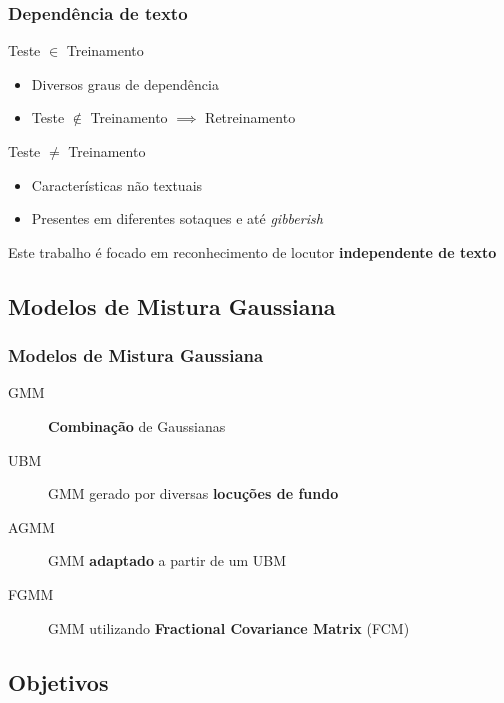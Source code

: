 \begin{frame}
\frametitle{Dependência de texto}
\begin{description}
    \item[Dependente] Teste $\in$ Treinamento
    \pause
    \begin{itemize}
        \item Diversos graus de dependência
        \pause
        \item Teste $\not\in$ Treinamento $\implies$ Retreinamento
        \pause
    \end{itemize}
    \item[Independente] Teste $\neq$ Treinamento
    \pause
    \begin{itemize}
        \item Características não textuais
        \pause
        \item Presentes em diferentes sotaques e até \emph{gibberish}
    \end{itemize}
    \pause
    \item Este trabalho é focado em reconhecimento de locutor \textbf{independente de texto}
\end{description}
\end{frame}

\subsection{Modelos de Mistura Gaussiana}

\begin{frame}
\frametitle{Modelos de Mistura Gaussiana}
\begin{description}
    \item[GMM] \textbf{Combinação} de Gaussianas
    \pause
    \item[UBM] GMM gerado por diversas \textbf{locuções de fundo}
    \pause
    \item[AGMM] GMM \textbf{adaptado} a partir de um UBM
    \pause
    \item[FGMM] GMM utilizando \textbf{Fractional Covariance Matrix} (FCM)
\end{description}
\end{frame}

\subsection{Objetivos}

